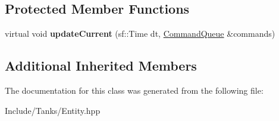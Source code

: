 \subsection*{Protected Member Functions}
\begin{DoxyCompactItemize}
\item 
\hypertarget{class_entity_a4ebebbbb20fcac7024fb3a9985ed2eff}{}virtual void {\bfseries update\+Current} (sf\+::\+Time dt, \hyperlink{class_command_queue}{Command\+Queue} \&commands)\label{class_entity_a4ebebbbb20fcac7024fb3a9985ed2eff}

\end{DoxyCompactItemize}
\subsection*{Additional Inherited Members}


The documentation for this class was generated from the following file\+:\begin{DoxyCompactItemize}
\item 
Include/\+Tanks/Entity.\+hpp\end{DoxyCompactItemize}
